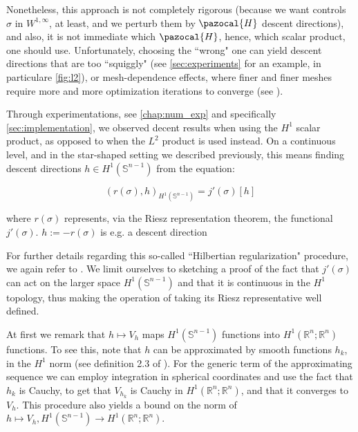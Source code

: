 \documentclass[english,a4paper,10pt,oneside]{scrbook}	%
\theoremstyle{break}
\theoremstyle{remark}
\newcommand{\mR}{\mathbb{R}}
\newcommand{\mS}{\mathbb{S}^{n-1}}
\begin{document}
Nonetheless, this approach is not completely rigorous (because we want controls $\sigma$ in $W^{1,\infty}$, at least, and we perturb them by $\pazocal{H}$ descent directions), and also, it is not immediate which $\pazocal{H}$, hence, which scalar product, one should use. Unfortunately, choosing the ``wrong" one can yield descent directions that are too ``squiggly" (see \cref{sec:experiments} for an example, in particulare \cref{fig:l2}), or mesh-dependence effects, where finer and finer meshes require more and more optimization iterations to converge (see \cite{mesh_dependence}).

Through experimentations, see \cref{chap:num_exp} and specifically \cref{sec:implementation}, we observed decent results when using the $H^1$ scalar product, as opposed to when the $L^2$ product is used instead. On a continuous level, and in the star-shaped setting we described previously, this means finding descent directions $h \in H^1(\mS)$ from the equation:

$$(r(\sigma),h)_{H^1(\mS)}  = j'(\sigma)[h]$$

where $r(\sigma)$ represents, via the Riesz representation theorem, the functional $j'(\sigma)$. $h:=-r(\sigma)$ is e.g. a descent direction


For further details regarding this so-called ``Hilbertian regularization" procedure, we again refer to \cite{allaire}.
We limit ourselves to sketching a proof of the fact that $j'(\sigma)$ can act on the larger space $H^1(\mS)$ and that it is continuous in the $H^1$ topology, thus making the operation of taking its Riesz representative well defined.

At first we remark that $h\mapsto V_h$ maps $H^1(\mS)$ functions into $H^1(\mR^n;\mR^n)$ functions. To see this, note that $h$ can be approximated by smooth functions $h_k$, in the $H^1$ norm (see definition 2.3 of \cite{aubin}). For the generic term of the approximating sequence we can employ integration in spherical coordinates and use the fact that $h_k$ is Cauchy, to get that $V_{h_k}$ is Cauchy in $H^1(\mR^n;\mR^n)$, and that it converges to $V_h$. This procedure also yields a bound on the norm of $h \mapsto V_h, H^1(\mS)\rightarrow H^1(\mR^n;\mR^n)$.
\end{document}
